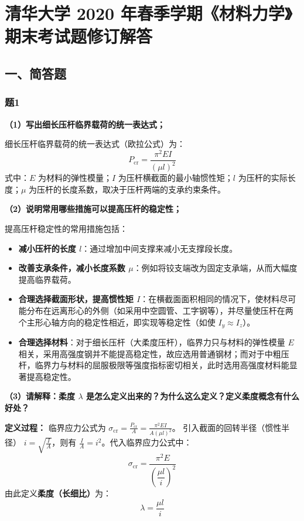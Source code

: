 \documentclass[11pt,a4paper]{ctexrep}
\begin{document}
\chapter{清华大学 2020 年春季学期《材料力学》期末考试题修订解答}
{


\vspace{-1.0cm}

\section*{一、简答题}

\subsection*{题1}
\textbf{（1）写出细长压杆临界载荷的统一表达式；}

细长压杆临界载荷的统一表达式（欧拉公式）为：
\[
    P_{\text{cr}} = \frac{\pi^2 EI}{(\mu l)^2}
\]
式中：$E$ 为材料的弹性模量；$I$ 为压杆横截面的最小轴惯性矩；$l$ 为压杆的实际长度；$\mu$ 为压杆的长度系数，取决于压杆两端的支承约束条件。

\textbf{（2）说明常用哪些措施可以提高压杆的稳定性；}

提高压杆稳定性的常用措施包括：
\begin{itemize}
    \item \textbf{减小压杆的长度 $l$}：通过增加中间支撑来减小无支撑段长度。
    \item \textbf{改善支承条件，减小长度系数 $\mu$}：例如将铰支端改为固定支承端，从而大幅度提高临界载荷。
    \item \textbf{合理选择截面形状，提高惯性矩 $I$}：在横截面面积相同的情况下，使材料尽可能分布在远离形心的外侧（如采用中空圆管、工字钢等），并尽量使压杆在两个主形心轴方向的稳定性相近，即实现等稳定性（如使 $I_y \approx I_z$）。
    \item \textbf{合理选择材料}：对于细长压杆（大柔度压杆），临界力只与材料的弹性模量 $E$ 相关，采用高强度钢并不能提高稳定性，故应选用普通钢材；而对于中粗压杆，临界力与材料的屈服极限等强度指标密切相关，此时选用高强度材料能显著提高稳定性。
\end{itemize}

\textbf{（3）请解释：柔度 $\lambda$ 是怎么定义出来的？为什么这么定义？定义柔度概念有什么好处？}

\textbf{定义过程：}
临界应力公式为 $\sigma_{\text{cr}} = \frac{P_{\text{cr}}}{A} = \frac{\pi^2 EI}{A(\mu l)^2}$。
引入截面的回转半径（惯性半径） $i = \sqrt{\frac{I}{A}}$，则有 $\frac{I}{A} = i^2$。代入临界应力公式中：
\[
    \sigma_{\text{cr}} = \frac{\pi^2 E}{\left(\dfrac{\mu l}{i}\right)^2}
\]
由此定义\textbf{柔度（长细比）}为：
\[
    \lambda = \frac{\mu l}{i}
\]

}
\end{document}
